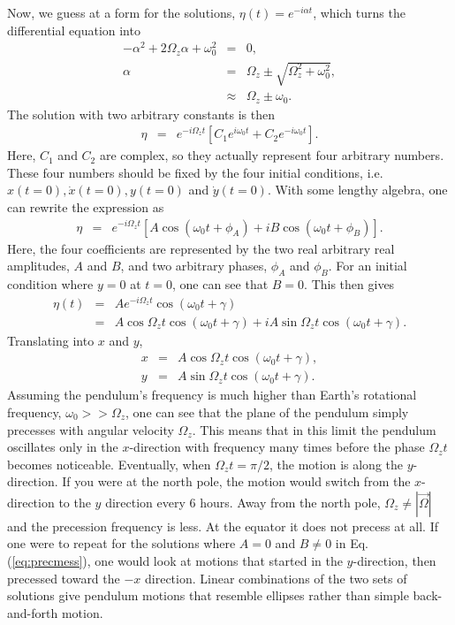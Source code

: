 Now, we guess at a form for the solutions, $\eta(t)=e^{-i\alpha t}$, which turns the differential equation into
\begin{eqnarray*}
-\alpha^2+2\Omega_z\alpha+\omega_0^2&=&0,\\
\alpha&=&\Omega_z\pm \sqrt{\Omega_z^2+\omega_0^2},\\
&\approx&\Omega_z\pm \omega_0.
\end{eqnarray*}
The solution with two arbitrary constants is then
\begin{eqnarray*}
\eta&=&e^{-i\Omega_zt}\left[C_1e^{i\omega_0t}+C_2e^{-i\omega_0t}\right].
\end{eqnarray*}
Here, $C_1$ and $C_2$ are complex, so they actually represent four arbitrary numbers. These four numbers should be fixed by the four initial conditions, i.e. $x(t=0), \dot{x}(t=0), y(t=0)$ and $\dot{y}(t=0)$. With some lengthy algebra, one can rewrite the expression as
\begin{eqnarray*}
\label{eq:precmess}
\eta&=&e^{-i\Omega_zt}\left[A\cos(\omega_0t+\phi_A)+iB\cos(\omega_0t+\phi_B)\right].
\end{eqnarray*}
Here, the four coefficients are represented by the two real arbitrary real amplitudes, $A$ and $B$, and two arbitrary phases, $\phi_A$ and $\phi_B$. For an initial condition where $y=0$ at $t=0$, one can see that $B=0$. This then gives
\begin{eqnarray*}
\eta(t)&=&Ae^{-i\Omega_zt}\cos(\omega_0t+\gamma)\\
\nonumber
&=&A\cos\Omega_zt\cos(\omega_0t+\gamma)+iA\sin\Omega_zt\cos(\omega_0t+\gamma).
\end{eqnarray*}
Translating into $x$ and $y$,
\begin{eqnarray}
x&=&A\cos\Omega_zt\cos(\omega_0t+\gamma),\\
\nonumber
y&=&A\sin\Omega_zt\cos(\omega_0t+\gamma).
\end{eqnarray}
Assuming the pendulum's frequency is much higher than Earth's rotational frequency, $\omega_0>>\Omega_z$, one can see that the plane of the pendulum simply precesses with angular velocity $\Omega_z$. This means that in this limit the pendulum oscillates only in the $x$-direction with frequency many times before the phase $\Omega_zt$ becomes noticeable. Eventually, when $\Omega_zt=\pi/2$, the motion is along the $y$-direction. If you were at the north pole, the motion would switch from the $x$-direction to the $y$ direction every 6 hours. Away from the north pole, $\Omega_z\ne|\vec{\Omega}|$ and the precession frequency is less.  At the equator it does not precess at all. If one were to repeat for the solutions where $A=0$ and $B\ne 0$ in Eq. (\ref{eq:precmess}), one would look at motions that started in the $y$-direction, then precessed toward the $-x$ direction. Linear combinations of the two sets of solutions give pendulum motions that resemble ellipses rather than simple back-and-forth motion.

